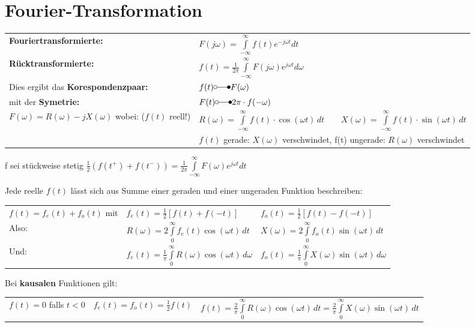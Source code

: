 \section{Fourier-Transformation}
\begin{tabular}{|p{6cm} l|} \hline
	\textbf{Fouriertransformierte:} &
	$F(j\omega) = \int\limits_{-\infty}^{\infty} f(t)e^{-j\omega t}dt$ \\
	\textbf{Rücktransformierte:} &
	$f(t) = \frac{1}{2\pi}\int\limits_{-\infty}^{\infty}F(j\omega)e^{j\omega t}d\omega$ \\ \hline

Dies ergibt das \textbf{Korespondenzpaar:} & $f(t) \laplace F(\omega)$ \\
mit der \textbf{Symetrie:} & $F(t) \laplace 2\pi \cdot f(-\omega)$ \\

$F(\omega) = R(\omega) -jX(\omega)$ wobei: ($f(t)$ reell!) &
$R(\omega) = \int\limits_{-\infty}^\infty f(t)\cdot \cos(\omega t)\,dt \quad\quad X(\omega) =
\int\limits_{-\infty}^\infty f(t)\cdot \sin(\omega t)\,dt$
\\
&$f(t)$ gerade: $X(\omega)$ verschwindet, f(t) ungerade: $R(\omega)$ verschwindet \\
\hline
\end{tabular}

f sei stückweise stetig $\frac{1}{2}(f(t^+) + f(t^-)) = \frac{1}{2\pi} \int\limits_{-\infty}^{\infty}F(\omega)e^{j\omega t} dt$

Jede reelle $f(t)$ lässt sich aus Summe einer geraden und einer ungeraden Funktion beschreiben:\\
\begin{tabular}{lll}
$f(t) = f_e(t) + f_o(t)$ mit & $f_e(t) = \frac{1}{2}[f(t) + f(-t)]$ & $f_o(t) = \frac{1}{2}[f(t) - f(-t)]$ \\

Also: & $R(\omega) = 2 \int\limits_0^\infty f_e(t) \cos(\omega t)\,dt$ & $X(\omega) = 2 \int\limits_0^\infty
f_o(t) \sin(\omega t)\,dt$ \\

Und: & $f_e(t) = \frac{1}{\pi}\int\limits_0^\infty R(\omega)\cos(\omega t)\,d\omega$ & 
$f_o(t) = \frac{1}{\pi}\int\limits_0^\infty X(\omega)\sin(\omega t)\,d\omega$ \\
\end{tabular}

Bei \textbf{kausalen} Funktionen gilt:\\
\begin{tabular}{c c c}
	$f(t) = 0$ falls $t<0$ & 
	$f_e(t) = f_o(t) = \frac{1}{2}f(t)$ &
	$f(t) = \frac{2}{\pi}\int\limits_0^\infty R(\omega) \cos(\omega t)\,dt = \frac{2}{\pi}\int\limits_0^\infty X(\omega) \sin(\omega t)\,dt$
\end{tabular}
	
